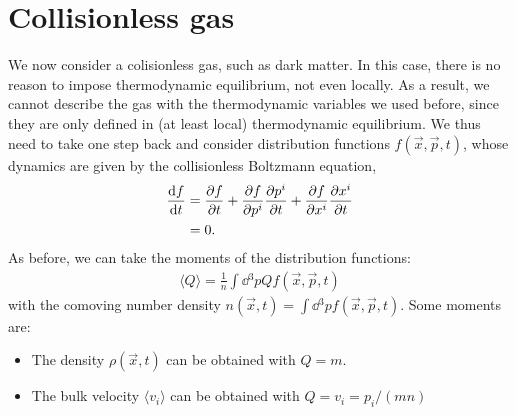\section{Collisionless gas}
We now consider a colisionless gas, such as dark matter. In this case, there is no reason to impose thermodynamic equilibrium, not even locally. As a result, we cannot describe the gas with the thermodynamic variables we used before, since they are only defined in (at least local) thermodynamic equilibrium. We thus need to take one step back and consider distribution functions $f(\vec{x}, \vec{p}, t)$, whose dynamics are given by the collisionless Boltzmann equation,
\begin{align*}
	\dv{f}{t}
	&= \pdv{f}{t} + \pdv{f}{p^i} \pdv{p^i}{t} + \pdv{f}{x^i} \pdv{x^i}{t}\\
	&= 0.
\end{align*}
As before, we can take the moments of the distribution functions:
\begin{align*}
	\langle Q \rangle = \frac{1}{n} \int \dd{^3p} Q f(\vec{x}, \vec{p}, t)
\end{align*}
with the comoving number density $n(\vec{x}, t) = \int \dd{^3p} f(\vec{x}, \vec{p}, t)$. Some moments are:
\begin{itemize}
	\item The density $\rho(\vec{x}, t)$ can be obtained with $Q = m$.
	\item The bulk velocity $\langle v_i \rangle$ can be obtained with $Q = v_i = p_i/(m n)$
\end{itemize}




























